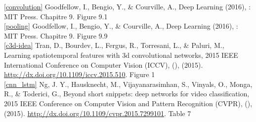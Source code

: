 \documentclass[11pt]{article}
\begin{document}
\ref{convolution} Goodfellow, I., Bengio, Y., \& Courville, A., Deep Learning (2016), : MIT Press. Chapitre 9. Figure 9.1\\

\ref{pooling} Goodfellow, I., Bengio, Y., \& Courville, A., Deep Learning (2016), : MIT Press. Chapitre 9. Figure 9.9\\

\ref{c3d-idea} Tran, D., Bourdev, L., Fergus, R., Torresani, L., \& Paluri, M., Learning spatiotemporal features with 3d convolutional networks, 2015 IEEE International Conference on Computer Vision (ICCV), (),  (2015).  \url{http://dx.doi.org/10.1109/iccv.2015.510}. Figure 1\\

\ref{cnn_lstm} Ng, J. Y., Hausknecht, M., Vijayanarasimhan, S., Vinyals, O., Monga, R., \& Toderici, G., Beyond short snippets: deep networks for video classification, 2015 IEEE Conference on Computer Vision and Pattern Recognition (CVPR), (),  (2015).  \url{http://dx.doi.org/10.1109/cvpr.2015.7299101}. Table 7\\
\\
\\
\end{document}
